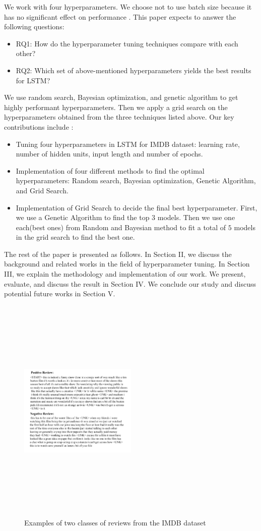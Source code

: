 \documentclass[conference]{IEEEtran}
\begin{document}
We work with four hyperparameters. We choose not to use batch size because it has no significant effect on performance \cite{batch}. This paper expects to answer the following questions: \begin{itemize}
\item  RQ1: How do the hyperparameter tuning techniques compare with each other?
\item  RQ2: Which set of above-mentioned hyperparameters yields the best results for LSTM?

    
\end{itemize}
We use random search, Bayesian optimization, and genetic algorithm to get highly performant hyperparameters. 
Then we apply a grid search on the hyperparameters obtained from the three techniques listed above. 
Our key contributions include :  
\begin{itemize}
    \item Tuning four hyperparameters in LSTM for IMDB dataset: learning rate, number of hidden units, input length and number of epochs.
    \item Implementation of four different methods to find the optimal hyperparameters: Random search, Bayesian optimization, Genetic Algorithm, and Grid Search.
    \item Implementation of Grid Search to decide the final best hyperparameter. First, we use a Genetic Algorithm to find the top $3$ models. Then we use one each(best ones) from Random and Bayesian method to fit a total of $5$ models in the grid search to find the best one.
\end{itemize}
The rest of the paper is presented as follows. In Section II, we discuss the background and related works in the field of hyperparameter tuning. In Section III, we explain the methodology and implementation of our work. We present, evaluate, and discuss the result in Section IV. We conclude our study and discuss potential future works in Section V.

\begin{figure}
\includegraphics[width=0.5\textwidth, height=11cm, keepaspectratio]{posnegtypes.png}
\caption{Examples of two classes of reviews from the IMDB dataset}
 \label{fig:eg}
\end{figure}
\end{document}
